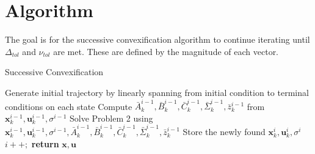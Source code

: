 \clearpage
\section{Algorithm}
The goal is for the successive convexification algorithm to continue iterating until $\Delta_{tol}$ and $\nu_{tol}$ are met. These are defined by the magnitude of each vector.


\begin{algorithm}
\caption{Successive Convexification}\label{Successive}
\begin{algorithmic}[1]
\State Generate initial trajectory by linearly spanning from initial condition to terminal conditions on each state
\State Compute $\bar{A}_k^{i-1}, \bar{B}_k^{i-1}, \bar{C}_k^{i-1}, \bar{\Sigma}_k^{i-1}, \bar{z}_k^{i-1}$ from $\mathbf{x}_k^{i-1}, \mathbf{u}_k^{i-1}, \sigma^{i-1}$
\State Solve Problem 2 using $\mathbf{x}_k^{i-1}, \mathbf{u}_k^{i-1}, \sigma^{i-1}, \bar{A}_k^{i-1}, \bar{B}_k^{i-1}, \bar{C}_k^{i-1}, \bar{\Sigma}_k^{i-1}, \bar{z}_k^{i-1}$
\State Store the newly found $\mathbf{x}_k^{i}, \mathbf{u}_k^{i}, \sigma^{i}$
\State $i++;$
\EndWhile 
\State \textbf{return} $\mathbf{x}, \mathbf{u}$
\EndProcedure
\end{algorithmic}
\end{algorithm}